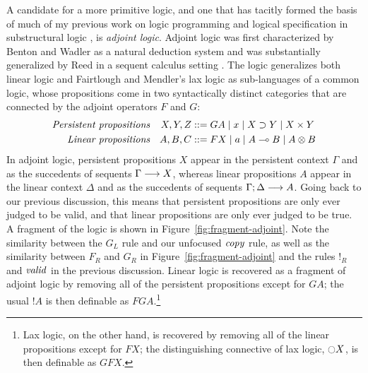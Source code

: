A candidate for a more primitive logic, and one that has tacitly
formed the basis of much of my previous work on logic programming and
logical specification in substructural logic
\cite{pfenning09substructural,simmons11weak,simmons11logical}, 
is {\it adjoint logic}.
Adjoint logic was first characterized by Benton and Wadler as a
natural deduction system \cite{benton96linear} and was substantially
generalized by Reed in a sequent calculus setting
\cite{reed09judgmental}. The logic generalizes both linear logic and
Fairtlough and Mendler's lax logic \cite{fairtlough97propositional}
as sub-languages of a common logic, whose propositions come
in two syntactically distinct categories that are connected by the
adjoint operators $F$ and $G$:
\begin{align*}
\mbox{\it Persistent propositions} & &
X, Y, Z & ::= G A \mid x \mid X \supset Y \mid X \times Y\\
\mbox{\it Linear propositions} & & 
A, B, C & ::= F X \mid a \mid A \multimap B \mid A \otimes B
\end{align*}
In adjoint logic, persistent propositions $X$ appear in the
persistent context $\Gamma$ and as the succedents of sequents
${\Gamma} \longrightarrow {X} \mathstrut$, whereas linear propositions $A$ appear in
the linear context $\Delta$ and as the succedents of sequents
${\Gamma};{\Delta} \longrightarrow {A} \mathstrut$. Going back to our previous discussion,
this means that persistent propositions are only ever judged
to be valid, and that linear propositions are only ever judged
to be true. A fragment of the logic is shown in
Figure~\ref{fig:fragment-adjoint}.  Note the similarity between the
$G_L$ rule and our unfocused ${\it copy}$ rule, as well as the
similarity between $F_R$ and $G_R$ in
Figure~\ref{fig:fragment-adjoint} and the rules ${!}_R$ and ${\it
  valid}$ in the previous discussion.  Linear logic is recovered as a
fragment of adjoint logic by removing all of the persistent
propositions except for $GA$; the usual ${!}A$ is then definable as
$FGA$.\footnote{Lax logic, on the other hand, is recovered by removing
  all of the linear propositions except for $FX$; the distinguishing
  connective of lax logic, $\ocircle X$, is then definable as $GFX$.}


